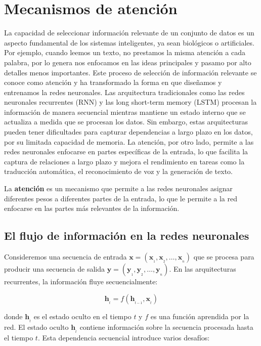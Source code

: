 \chapter{Mecanismos de atención}

La capacidad de seleccionar información relevante de un conjunto de datos es un aspecto fundamental de los sistemas
inteligentes, ya sean biológicos o artificiales. Por ejemplo, cuando leemos un texto, no prestamos la misma atención a
cada palabra, por lo genera nos enfocamos en las ideas principales y pasamo por alto detalles menos importantes. Este
proceso de selección de información relevante se conoce como atención y ha transformado la forma en que diseñamos y
entrenamos la redes neuronales. Las arquitectura tradicionales como las redes neuronales recurrentes (RNN) y las long
short-term memory (LSTM) procesan la información de manera secuencial mientras mantiene un estado interno que se
actualiza a medida que se procesan los datos. Sin embargo, estas arquitecturas pueden tener dificultades para capturar
dependencias a largo plazo en los datos, por su limitada capacidad de memoria. La atención, por otro lado, permite a
las redes neuronales enfocarse en partes específicas de la entrada, lo que facilita la captura de relaciones a largo
plazo y mejora el rendimiento en tareas como la traducción automática, el reconocimiento de voz y la generación de
texto.

La \textbf{atención} es un mecanismo que permite a las redes neuronales asignar diferentes pesos a diferentes partes de
la entrada, lo que le permite a la red enfocarse en las partes más relevantes de la información.

\section{El flujo de información en la redes neuronales}

Consideremos una secuencia de entrada \(\pmb{x}=(\pmb{x}_{_1}, \pmb{x}_{_2}, \ldots, \pmb{x}_{_n})\) que se procesa
para producir una secuencia de salida \(\pmb{y}=(\pmb{y}_{_1}, \pmb{y}_{_2}, \ldots, \pmb{y}_{_n})\). En las
arquitecturas recurrentes, la información fluye secuencialmente:

\begin{equation}
    \pmb{h}_{_t} = f(\pmb{h}_{_{t-1}}, \pmb{x}_{_t})
\end{equation}

donde \(\pmb{h}_{_t}\) es el estado oculto en el tiempo \(t\) y \(f\) es una función aprendida por la red. El estado
oculto \(\pmb{h}_{_t}\) contiene información sobre la secuencia procesada hasta el tiempo \(t\). Esta dependencia
secuencial introduce varios desafíos:


